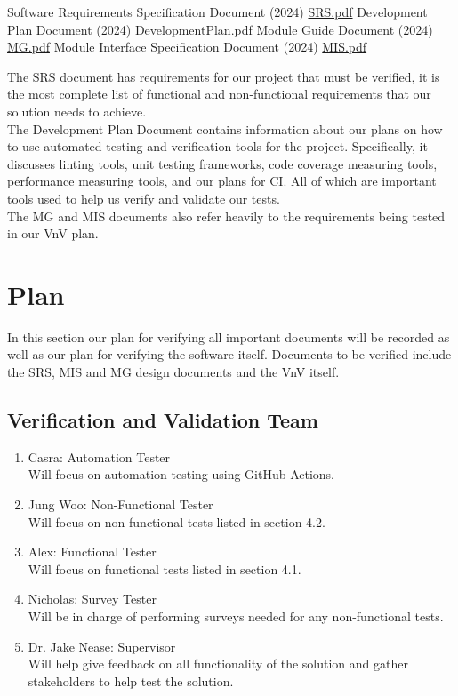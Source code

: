 \documentclass[12pt, titlepage]{article}
\begin{document}
\begin{thebibliography}{9}
   Software Requirements Specification Document (2024)
  \href{../SRS-Volere/SRS.pdf}{SRS.pdf}
   Development Plan Document (2024)
  \href{../DevelopmentPlan/DevelopmentPlan.pdf}{DevelopmentPlan.pdf}
   Module Guide Document (2024)
  \href{../Design/SoftArchitecture/MG.pdf}{MG.pdf}
   Module Interface Specification Document (2024)
  \href{../Design/SoftDetailedDes/MIS.pdf}{MIS.pdf}
  \\
\end{thebibliography}

The SRS document has requirements for our project that must be verified, it is
the most complete list of functional and non-functional requirements that our
solution needs to achieve.\\

The Development Plan Document contains information about our plans on how to use 
automated testing and verification tools for the project. Specifically, it discusses
linting tools, unit testing frameworks, code coverage measuring tools, performance
measuring tools, and our plans for CI. All of which are important tools used to 
help us verify and validate our tests.\\

The MG and MIS documents also refer heavily to the requirements being tested
in our VnV plan.

\section{Plan}

In this section our plan for verifying all important documents will be
recorded as well as our plan for verifying the software itself. Documents to
be verified include the SRS, MIS and MG design documents and the VnV itself.

\subsection{Verification and Validation Team}

\begin{enumerate}
  \item Casra: Automation Tester\\
  Will focus on automation testing using GitHub Actions.
  \item Jung Woo: Non-Functional Tester\\
  Will focus on non-functional tests listed in section 4.2.
  \item Alex: Functional Tester\\
  Will focus on functional tests listed in section 4.1.
  \item Nicholas: Survey Tester\\
  Will be in charge of performing surveys needed for any non-functional tests.
  \item Dr. Jake Nease: Supervisor\\
  Will help give feedback on all functionality of the solution and gather
  stakeholders to help test the solution.
\end{enumerate}
\end{document}
